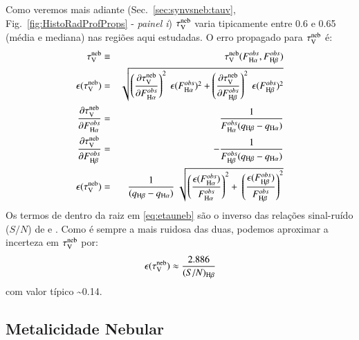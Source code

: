 Como veremos mais adiante (Sec.\ \ref{sec:synvsneb:tauv}, Fig.\ \ref{fig:HistoRadProfProps} - {\em
painel i}) $\tau_{\mathrm{V}}^{\mathrm{neb}}$ varia tipicamente entre 0.6 e 0.65 (média e mediana) nas regiões aqui estudadas.
O erro propagado para $\tau_{\mathrm{V}}^{\mathrm{neb}}$ é:
\begin{eqnarray}
	\tauVN &\equiv& \tauVN(F_{\Halpha}^{obs}, F_{\Hbeta}^{obs}) \\
	\epsilon (\tauVN) &=& \sqrt{\left(\del{\tauVN}{F_{\Halpha}^{obs}}\right)^2 \
\epsilon (F_{\Halpha}^{obs})^2 + \left(\del{\tauVN}{F_{\Hbeta}^{obs}}\right)^2 \
\epsilon (F_{\Hbeta}^{obs})^2 } \\
	\del{\tauVN}{F_{\Halpha}^{obs}} &=& \frac{1}{F_{\Halpha}^{obs} (q_{\Hbeta} - q_{\Halpha})} \\
	\del{\tauVN}{F_{\Hbeta}^{obs}} &=& - \frac{1}{F_{\Hbeta}^{obs} (q_{\Hbeta} - q_{\Halpha})} \\
	\epsilon (\tauVN) &=& \frac{1}{(q_{\Hbeta} - q_{\Halpha})} \
\sqrt{\left(\frac{\epsilon (F_{\Halpha}^{obs})}{F_{\Halpha}^{obs}}\right)^2 + \
\left(\frac{\epsilon (F_{\Hbeta}^{obs})}{F_{\Hbeta}^{obs}}\right)^2 }
	\label{eq:etauneb}
\end{eqnarray}
\noindent Os termos de dentro da raiz em \eqref{eq:etauneb} são o inverso das relações sinal-ruído
($S/N$) de \Halpha e \Hbeta. Como \Hbeta é sempre a mais ruidosa das duas, podemos aproximar a
incerteza em $\tau_{\mathrm{V}}^{\mathrm{neb}}$ por:
\begin{equation}
	\epsilon (\tauVN) \approx \frac{2.886}{(S/N)_{\Hbeta}}
	\label{eq:etaunebaprox}
\end{equation}
\noindent com valor típico \sim 0.14.

\subsection{Metalicidade Nebular}
\label{sec:emline:datacube:Zneb}

